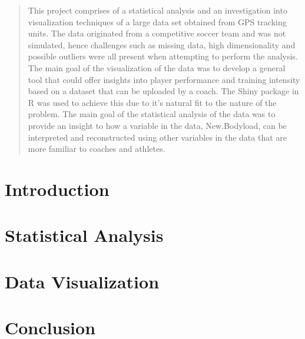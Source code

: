\documentclass[a4paper, 12pt, twoside]{report}
\begin{document}
	\begin{abstract}
		This project comprises of a statistical analysis and an investigation into visualization techniques of a large data set obtained from GPS tracking units. The data originated from a competitive soccer team and was not simulated, hence challenges such as missing data, high dimensionality and possible outliers were all present when attempting to perform the analysis. The main goal of the visualization of the data was to develop a general tool that could offer insights into player performance and training intensity based on a dataset that can be uploaded by a coach. The Shiny package in R was used to achieve this due to it's natural fit to the nature of the problem. The main goal of the statistical analysis of the data was to provide an insight to how a variable in the data, New.Bodyload, can be interpreted and reconstructed using other variables in the data that are more familiar to coaches and athletes.
		
	\end{abstract}
	\tableofcontents
	
	\newpage	
	\chapter{Introduction}
	
	
	\newpage
	\chapter{Statistical Analysis}
	
	
	\newpage
	\chapter{Data Visualization}
	
	
	\newpage
	\chapter{Conclusion}
	
	
\end{document}
